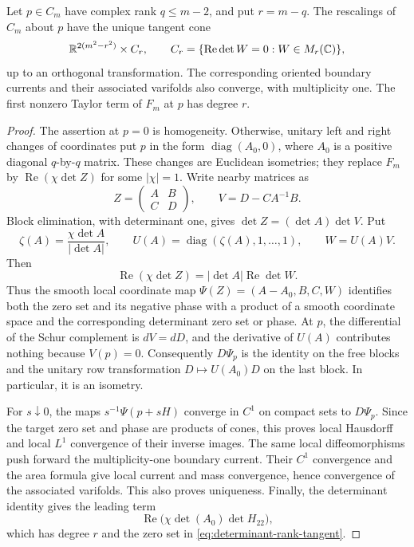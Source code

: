 \begin{proposition}
\label{prop:determinant-tangent-strata}
Let $p\in C_m$ have complex rank $q\leq m-2$, and put $r=m-q$.
The rescalings of $C_m$ about $p$ have the unique tangent cone
\begin{equation}\label{eq:determinant-rank-tangent}
 \mathbb R^{2(m^2-r^2)}\times C_r,
 \qquad C_r=\{\operatorname{Re}\det W=0:W\in M_r(\mathbb C)\},
\end{equation}
up to an orthogonal transformation. The corresponding oriented
boundary currents and their associated varifolds also converge,
with multiplicity one. The first nonzero Taylor term of $F_m$ at
$p$ has degree $r$.
\end{proposition}

\begin{proof}
The assertion at $p=0$ is homogeneity. Otherwise, unitary left and
right changes of coordinates put $p$ in the form
$\operatorname{diag}(A_0,0)$, where $A_0$ is a positive diagonal
$q$-by-$q$ matrix. These changes are Euclidean isometries; they
replace $F_m$ by $\operatorname{Re}(\chi\det Z)$ for some
$|\chi|=1$. Write nearby matrices as
\[
 Z=\begin{pmatrix}A&B\\ C&D\end{pmatrix},\qquad
 V=D-CA^{-1}B.
\]
Block elimination, with determinant one, gives
$\det Z=(\det A)\det V$. Put
\[
 \zeta(A)=\frac{\chi\det A}{|\det A|},\qquad
 U(A)=\operatorname{diag}(\zeta(A),1,\ldots,1),\qquad
 W=U(A)V.
\]
Then
\[
 \operatorname{Re}(\chi\det Z)=|\det A|\operatorname{Re}\det W.
\]
Thus the smooth local coordinate map \(\Psi(Z)=(A-A_0,B,C,W)\)
identifies both the zero set and its negative phase with a product
of a smooth coordinate space and the corresponding determinant
zero set or phase. At $p$, the differential of the Schur complement
is $dV=dD$, and the derivative of $U(A)$ contributes nothing
because $V(p)=0$. Consequently $D\Psi_p$ is the identity on the
free blocks and the unitary row transformation $D\mapsto U(A_0)D$
on the last block. In particular, it is an isometry.

For $s\downarrow0$, the maps $s^{-1}\Psi(p+sH)$ converge in
$C^1$ on compact sets to $D\Psi_p$. Since the target zero set and
phase are products of cones, this proves local Hausdorff and
local $L^1$ convergence of their inverse images. The same local
diffeomorphisms push forward the multiplicity-one boundary
current. Their $C^1$ convergence and the area formula give local
current and mass convergence, hence convergence of the associated
varifolds. This also proves uniqueness. Finally, the determinant
identity gives the leading term
\[
 \operatorname{Re}\bigl(\chi\det(A_0)\det H_{22}\bigr),
\]
which has degree $r$ and the zero set in
\eqref{eq:determinant-rank-tangent}.
\end{proof}

